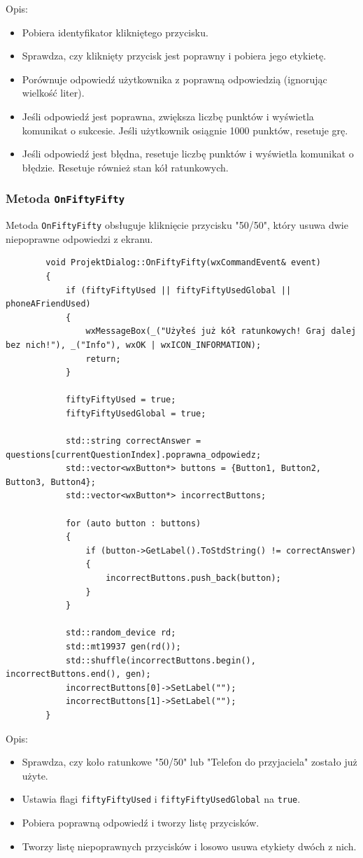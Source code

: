 \documentclass[]{article}
\begin{document}
	Opis:
	\begin{itemize}
		\item Pobiera identyfikator klikniętego przycisku.
		\item Sprawdza, czy kliknięty przycisk jest poprawny i pobiera jego etykietę.
		\item Porównuje odpowiedź użytkownika z poprawną odpowiedzią (ignorując wielkość liter).
		\item Jeśli odpowiedź jest poprawna, zwiększa liczbę punktów i wyświetla komunikat o sukcesie. Jeśli użytkownik osiągnie 1000 punktów, resetuje grę.
		\item Jeśli odpowiedź jest błędna, resetuje liczbę punktów i wyświetla komunikat o błędzie. Resetuje również stan kół ratunkowych.
	\end{itemize}
	
	\subsubsection{Metoda \texttt{OnFiftyFifty}}
	
	Metoda \texttt{OnFiftyFifty} obsługuje kliknięcie przycisku "50/50", który usuwa dwie niepoprawne odpowiedzi z ekranu.
	
	\begin{verbatim}
		void ProjektDialog::OnFiftyFifty(wxCommandEvent& event)
		{
			if (fiftyFiftyUsed || fiftyFiftyUsedGlobal || phoneAFriendUsed)
			{
				wxMessageBox(_("Użyłeś już kół ratunkowych! Graj dalej bez nich!"), _("Info"), wxOK | wxICON_INFORMATION);
				return;
			}
			
			fiftyFiftyUsed = true;
			fiftyFiftyUsedGlobal = true;
			
			std::string correctAnswer = questions[currentQuestionIndex].poprawna_odpowiedz;
			std::vector<wxButton*> buttons = {Button1, Button2, Button3, Button4};
			std::vector<wxButton*> incorrectButtons;
			
			for (auto button : buttons)
			{
				if (button->GetLabel().ToStdString() != correctAnswer)
				{
					incorrectButtons.push_back(button);
				}
			}
			
			std::random_device rd;
			std::mt19937 gen(rd());
			std::shuffle(incorrectButtons.begin(), incorrectButtons.end(), gen);
			incorrectButtons[0]->SetLabel("");
			incorrectButtons[1]->SetLabel("");
		}
	\end{verbatim}
	
	Opis:
	\begin{itemize}
		\item Sprawdza, czy koło ratunkowe "50/50" lub "Telefon do przyjaciela" zostało już użyte.
		\item Ustawia flagi \texttt{fiftyFiftyUsed} i \texttt{fiftyFiftyUsedGlobal} na \texttt{true}.
		\item Pobiera poprawną odpowiedź i tworzy listę przycisków.
		\item Tworzy listę niepoprawnych przycisków i losowo usuwa etykiety dwóch z nich.
	\end{itemize}
	
\end{document}
